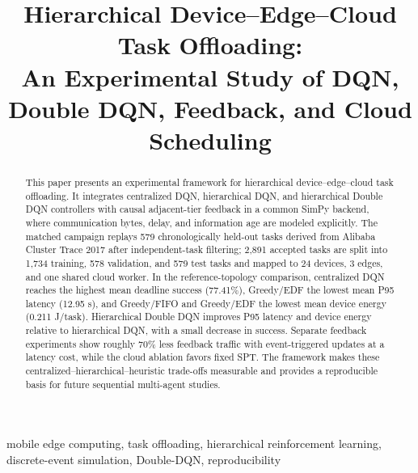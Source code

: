 \documentclass[conference]{IEEEtran}
\title{Hierarchical Device--Edge--Cloud Task Offloading:\\
An Experimental Study of DQN, Double DQN, Feedback, and Cloud Scheduling}
\author{\IEEEauthorblockN{Tasnim Mizaoui, Farah Cherif, and Doua Bousnina}
\IEEEauthorblockA{INSAT, Tunis, Tunisia\\
}}
\begin{document}
\maketitle

\begin{abstract}
This paper presents an experimental framework for hierarchical
device--edge--cloud task offloading. It integrates centralized DQN,
hierarchical DQN, and hierarchical Double DQN controllers with causal
adjacent-tier feedback in a common SimPy backend, where communication bytes,
delay, and information age are modeled explicitly. The matched campaign
replays 579 chronologically held-out tasks derived from Alibaba Cluster Trace
2017 after independent-task filtering; 2,891 accepted tasks are split into
1,734 training, 578 validation, and 579 test tasks and mapped to 24 devices,
3 edges, and one shared cloud worker. In the reference-topology comparison,
centralized DQN reaches the highest mean deadline success (77.41\%),
Greedy/EDF the lowest mean P95 latency (12.95 s), and Greedy/FIFO and
Greedy/EDF the lowest mean device energy (0.211 J/task). Hierarchical Double
DQN improves P95 latency and device energy relative to hierarchical DQN, with
a small decrease in success. Separate feedback experiments show roughly 70\%
less feedback traffic with event-triggered updates at a latency cost, while
the cloud ablation favors fixed SPT. The framework makes these
centralized--hierarchical--heuristic trade-offs measurable and provides a
reproducible basis for future sequential multi-agent studies.
\end{abstract}

\begin{IEEEkeywords}
mobile edge computing, task offloading, hierarchical reinforcement learning,
discrete-event simulation, Double-DQN, reproducibility
\end{IEEEkeywords}









\end{document}
